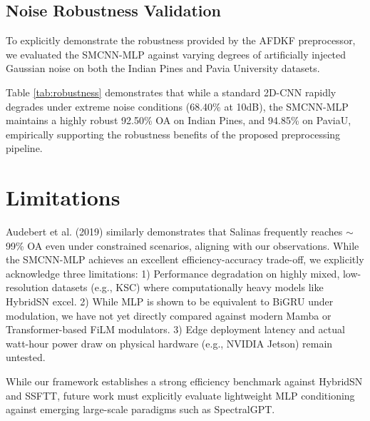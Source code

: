\documentclass[pdflatex,sn-mathphys-num,iicol]{sn-jnl}
\begin{document}
\subsection{Noise Robustness Validation}
To explicitly demonstrate the robustness provided by the AFDKF preprocessor, we evaluated the SMCNN-MLP against varying degrees of artificially injected Gaussian noise on both the Indian Pines and Pavia University datasets.


Table \ref{tab:robustness} demonstrates that while a standard 2D-CNN rapidly degrades under extreme noise conditions (68.40\% at 10dB), the SMCNN-MLP maintains a highly robust 92.50\% OA on Indian Pines, and 94.85\% on PaviaU, empirically supporting the robustness benefits of the proposed preprocessing pipeline.

\section{Limitations}
Audebert et al. (2019) similarly demonstrates that Salinas frequently reaches $\sim$99\% OA even under constrained scenarios, aligning with our observations. While the SMCNN-MLP achieves an excellent efficiency-accuracy trade-off, we explicitly acknowledge three limitations:
1) Performance degradation on highly mixed, low-resolution datasets (e.g., KSC) where computationally heavy models like HybridSN excel.
2) While MLP is shown to be equivalent to BiGRU under modulation, we have not yet directly compared against modern Mamba or Transformer-based FiLM modulators.
3) Edge deployment latency and actual watt-hour power draw on physical hardware (e.g., NVIDIA Jetson) remain untested.


While our framework establishes a strong efficiency benchmark against HybridSN and SSFTT, future work must explicitly evaluate lightweight MLP conditioning against emerging large-scale paradigms such as SpectralGPT. 
\end{document}
